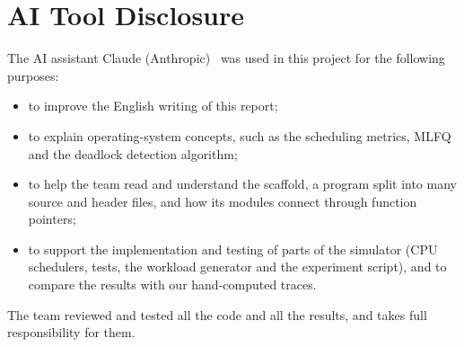 \section*{AI Tool Disclosure}
The AI assistant Claude (Anthropic)~\cite{claude} was used in this project for the following purposes:
\begin{itemize}
    \item to improve the English writing of this report;
    \item to explain operating-system concepts, such as the scheduling metrics, MLFQ and the deadlock detection algorithm;
    \item to help the team read and understand the scaffold, a program split into many source and header files, and how its modules connect through function pointers;
    \item to support the implementation and testing of parts of the simulator (CPU schedulers, tests, the workload generator and the experiment script), and to compare the results with our hand-computed traces.
\end{itemize}
The team reviewed and tested all the code and all the results, and takes full responsibility for them.
